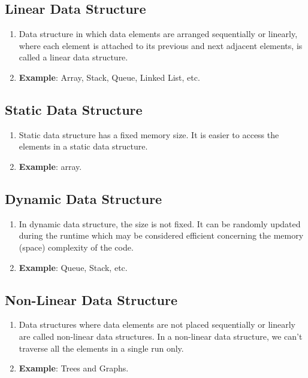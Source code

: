 \subsection{Linear Data Structure \cite{gfg-data-structures}}
\begin{enumerate}
    \item Data structure in which data elements are arranged sequentially or linearly, where each element is attached to its previous and next adjacent elements, is called a linear data structure.
    
    \item \textbf{Example}: Array, Stack, Queue, Linked List, etc.
\end{enumerate}

\subsection{Static Data Structure \cite{gfg-data-structures}}
\begin{enumerate}
    \item Static data structure has a fixed memory size. It is easier to access the elements in a static data structure. 

    \item \textbf{Example}: array.
\end{enumerate}

\subsection{Dynamic Data Structure \cite{gfg-data-structures}}
\begin{enumerate}
    \item In dynamic data structure, the size is not fixed. It can be randomly updated during the runtime which may be considered efficient concerning the memory (space) complexity of the code.

    \item \textbf{Example}: Queue, Stack, etc.
\end{enumerate}

\subsection{Non-Linear Data Structure \cite{gfg-data-structures}}
\begin{enumerate}
    \item Data structures where data elements are not placed sequentially or linearly are called non-linear data structures. In a non-linear data structure, we can’t traverse all the elements in a single run only.
    
    \item \textbf{Example}: Trees and Graphs.
\end{enumerate}

